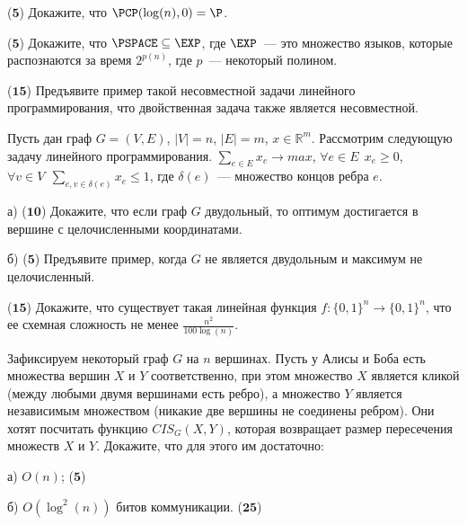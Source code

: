 \begin{task}($\mathbf{5}$)
    Докажите, что $\PCP(\log(n), 0) = \P$.
\end{task}

\begin{task}($\mathbf{5}$)
	Докажите, что $\PSPACE \subseteq \EXP$, где $\EXP$~--- это множество языков,
    которые распознаются за время $2^{p(n)}$, где $p$~--- некоторый полином.
\end{task}

\begin{task}($\mathbf{15}$)
    Предъявите пример такой несовместной задачи линейного программирования, что
    двойственная задача также является несовместной.
\end{task}

\begin{task}
    Пусть дан граф $G = (V, E)$, $|V| = n$, $|E| = m$, $x \in
    \mathbb{R}^m$. Рассмотрим следующую задачу линейного программирования.
    $\sum_{e \in E} x_e \rightarrow max$, $\forall e \in E ~~ x_e \ge 0$,
    $\forall v \in V ~~ \sum_{e, v \in \delta(e)} x_e \le 1$, где $\delta(e)$~---
    множество концов ребра $e$.

    а) ($\mathbf{10}$) Докажите, что если граф $G$ двудольный, то оптимум достигается в вершине с
    целочисленными координатами.

    б) ($\mathbf{5}$) Предъявите пример, когда $G$ не является двудольным и максимум не целочисленный.
\end{task}

\begin{task}($\mathbf{15}$)
    Докажите, что существует такая линейная функция $f: \{0, 1\}^{n}
    \rightarrow \{0, 1\}^n$, что ее схемная сложность не менее
    $\frac{n^2}{100 \log(n)}$.  
\end{task}

\begin{task}
    Зафиксируем некоторый граф $G$ на $n$ вершинах. Пусть у Алисы и Боба есть
    множества вершин $X$ и  $Y$ соответственно, при этом множество $X$ является
    кликой (между любыми двумя вершинами есть ребро), а множество $Y$ является
    независимым множеством (никакие две вершины не соединены ребром). Они хотят
    посчитать функцию $CIS_G(X, Y)$, которая возвращает размер пересечения множеств
    $X$ и $Y$. Докажите, что для этого им достаточно:

    а) $O(n)$; ($\mathbf{5}$)

    б) $O(\log^2(n))$ битов коммуникации. ($\mathbf{25}$)
\end{task}


